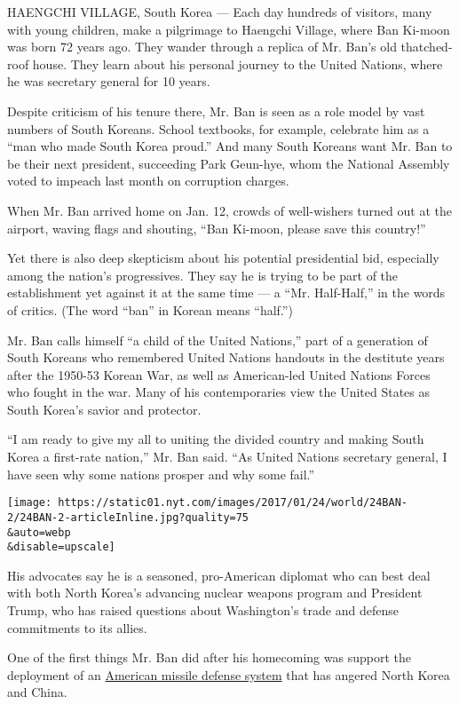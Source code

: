 HAENGCHI VILLAGE, South Korea --- Each day hundreds of visitors, many
with young children, make a pilgrimage to Haengchi Village, where Ban
Ki-moon was born 72 years ago. They wander through a replica of Mr.
Ban's old thatched-roof house. They learn about his personal journey to
the United Nations, where he was secretary general for 10 years.

Despite criticism of his tenure there, Mr. Ban is seen as a role model
by vast numbers of South Koreans. School textbooks, for example,
celebrate him as a ``man who made South Korea proud.'' And many South
Koreans want Mr. Ban to be their next president, succeeding Park
Geun-hye, whom the National Assembly voted to impeach last month on
corruption charges.

When Mr. Ban arrived home on Jan. 12, crowds of well-wishers turned out
at the airport, waving flags and shouting, ``Ban Ki-moon, please save
this country!''

Yet there is also deep skepticism about his potential presidential bid,
especially among the nation's progressives. They say he is trying to be
part of the establishment yet against it at the same time --- a ``Mr.
Half-Half,'' in the words of critics. (The word ``ban'' in Korean means
``half.'')

Mr. Ban calls himself ``a child of the United Nations,'' part of a
generation of South Koreans who remembered United Nations handouts in
the destitute years after the 1950-53 Korean War, as well as
American-led United Nations Forces who fought in the war. Many of his
contemporaries view the United States as South Korea's savior and
protector.

``I am ready to give my all to uniting the divided country and making
South Korea a first-rate nation,'' Mr. Ban said. ``As United Nations
secretary general, I have seen why some nations prosper and why some
fail.''

\texttt{[image: https://static01.nyt.com/images/2017/01/24/world/24BAN-2/24BAN-2-articleInline.jpg?quality=75\\\&auto=webp\\\&disable=upscale]}

His advocates say he is a seasoned, pro-American diplomat who can best
deal with both North Korea's advancing nuclear weapons program and
President Trump, who has raised questions about Washington's trade and
defense commitments to its allies.

One of the first things Mr. Ban did after his homecoming was support the
deployment of an
\href{https://www.nytimes.com/2016/07/08/world/asia/south-korea-and-us-agree-to-deploy-missile-defense-system.html}{American
missile defense system} that has angered North Korea and China.

